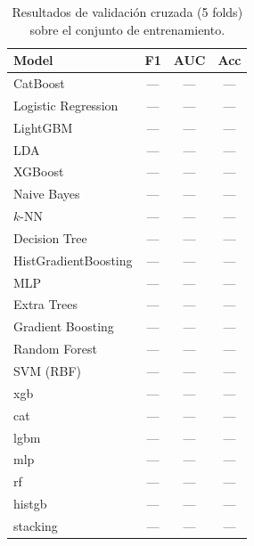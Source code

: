 \begin{table}[ht]
\centering
\caption{Resultados de validación cruzada (5 folds) sobre el conjunto de entrenamiento.}
\label{tab:baseline}
\begin{tabular}{lccc}
\toprule
\textbf{Model} & F1 & AUC & Acc \\
\midrule
CatBoost & --- & --- & --- \\
Logistic Regression & --- & --- & --- \\
LightGBM & --- & --- & --- \\
LDA & --- & --- & --- \\
XGBoost & --- & --- & --- \\
Naive Bayes & --- & --- & --- \\
$k$-NN & --- & --- & --- \\
Decision Tree & --- & --- & --- \\
HistGradientBoosting & --- & --- & --- \\
MLP & --- & --- & --- \\
Extra Trees & --- & --- & --- \\
Gradient Boosting & --- & --- & --- \\
Random Forest & --- & --- & --- \\
SVM (RBF) & --- & --- & --- \\
xgb & --- & --- & --- \\
cat & --- & --- & --- \\
lgbm & --- & --- & --- \\
mlp & --- & --- & --- \\
rf & --- & --- & --- \\
histgb & --- & --- & --- \\
stacking & --- & --- & --- \\
\bottomrule
\end{tabular}
\end{table}
